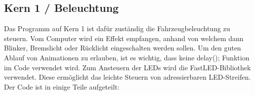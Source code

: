 \subsection{Kern 1 / Beleuchtung}
	Das Programm auf Kern 1 ist dafür zuständig die Fahrzeugbeleuchtung zu steuern. Vom Computer wird ein Effekt empfangen, anhand von welchem dann Blinker, Bremslicht oder Rücklicht eingeschalten werden sollen. Um den guten Ablauf von Animationen zu erlauben, ist es wichtig, dass keine delay(); Funktion im Code verwendet wird. Zum Ansteuern der LEDs wird die FastLED-Bibliothek verwendet. Diese ermöglicht das leichte Steuern von adressierbaren LED-Streifen. Der Code ist in einige Teile aufgeteilt:
	
		\subsubsection{}